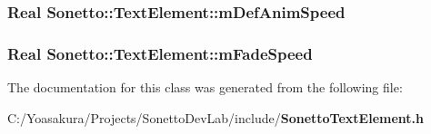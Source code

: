 \subsubsection{\setlength{\rightskip}{0pt plus 5cm}Real {\bf Sonetto::TextElement::mDefAnimSpeed}\hspace{0.3cm}{\tt  [protected]}}\label{class_sonetto_1_1_text_element_30c6e7be7efe63c2194d2cfcb00f23a1}


\subsubsection{\setlength{\rightskip}{0pt plus 5cm}Real {\bf Sonetto::TextElement::mFadeSpeed}\hspace{0.3cm}{\tt  [protected]}}\label{class_sonetto_1_1_text_element_e337eb0715e7648eafa08bfb550a9e86}




The documentation for this class was generated from the following file:\begin{CompactItemize}
\item 
C:/Yoasakura/Projects/SonettoDevLab/include/{\bf SonettoTextElement.h}\end{CompactItemize}
